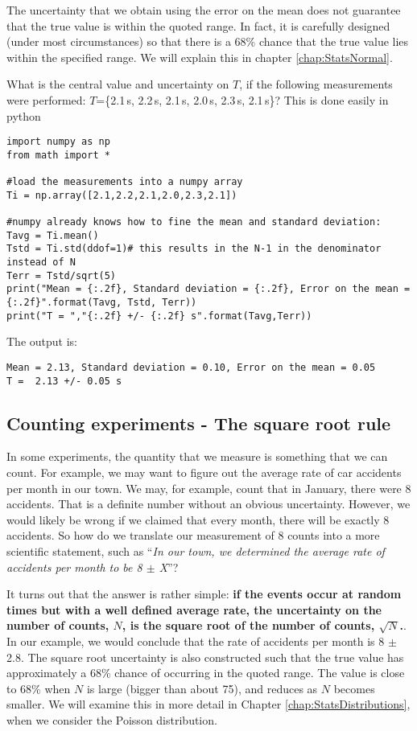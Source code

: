The uncertainty that we obtain using the error on the mean does not guarantee that the true value is within the quoted range. In fact, it is carefully designed (under most circumstances) so that there is a 68\% chance that the true value lies within the specified range. We will explain this in chapter \ref{chap:StatsNormal}.

\begin{example}{0pt}{What is the central value and uncertainty on $T$, if the following measurements were performed: $T$=\{2.1\,s, 2.2\,s, 2.1\,s, 2.0\,s, 2.3\,s, 2.1\,s\}?}{}
\label{ex:ChapUncertainties_mean}
This is done easily in python
\begin{lstlisting}[frame=single] 
import numpy as np
from math import *

#load the measurements into a numpy array
Ti = np.array([2.1,2.2,2.1,2.0,2.3,2.1])

#numpy already knows how to fine the mean and standard deviation:
Tavg = Ti.mean()
Tstd = Ti.std(ddof=1)# this results in the N-1 in the denominator instead of N
Terr = Tstd/sqrt(5)
print("Mean = {:.2f}, Standard deviation = {:.2f}, Error on the mean = {:.2f}".format(Tavg, Tstd, Terr))
print("T = ","{:.2f} +/- {:.2f} s".format(Tavg,Terr))
\end{lstlisting}
The output is:
\begin{verbatim}
Mean = 2.13, Standard deviation = 0.10, Error on the mean = 0.05
T =  2.13 +/- 0.05 s
\end{verbatim}

\end{example}


\subsection{Counting experiments - The square root rule}
\label{sec:countingError}
In some experiments, the quantity that we measure is something that we can count. For example, we may want to figure out the average rate of car accidents per month in our town. We may, for example, count that in January, there were 8 accidents. That is a definite number without an obvious uncertainty. However, we would likely be wrong if we claimed that every month, there will be exactly 8 accidents. So how do we translate our measurement of 8 counts into a more scientific statement, such as ``\textit{In our town, we determined the average rate of accidents per month to be 8 $\pm$ X}''? 

It turns out that the answer is rather simple: \textbf{if the events occur at random times but with a well defined average rate, the uncertainty on the number of counts, $N$, is the square root of the number of counts, $\sqrt{N}$.}. In our example, we would conclude that the rate of accidents per month is 8 $\pm$ 2.8. The square root uncertainty is also constructed such that the true value has approximately a 68\% chance of occurring in the quoted range. The value is close to 68\% when $N$ is large (bigger than about 75), and reduces as $N$ becomes smaller. We will examine this in more detail in Chapter \ref{chap:StatsDistributions}, when we consider the Poisson distribution.

